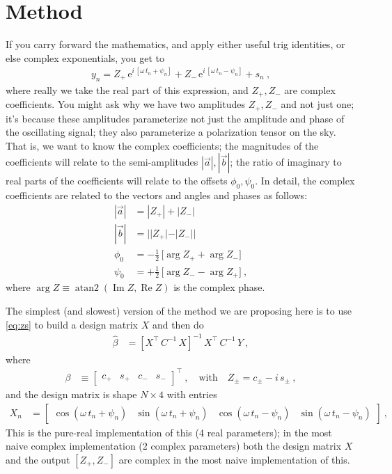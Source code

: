 \documentclass{article}
\newcommand{\e}{\mathrm{e}}
\begin{document}
\section{Method}\label{sec:method}
If you carry forward the mathematics, and apply either useful trig identities, or else complex exponentials, you get to
\begin{align}
    y_n = Z_+\,\e^{i\,[\omega\,t_n + \psi_n]} + Z_-\,\e^{i\,[\omega\,t_n - \psi_n]} + s_n ~, \label{eq:zs}
\end{align}
where really we take the real part of this expression,
and $Z_+, Z_-$ are complex coefficients.
You might ask why we have two amplitudes $Z_+, Z_-$ and not just one; it's because these amplitudes parameterize not just the amplitude and phase of the oscillating signal; they also parameterize a polarization tensor on the sky.
That is, we want to know the complex coefficients; the magnitudes of the coefficients will relate to the semi-amplitudes $|\vec{a}|,|\vec{b}|$; the ratio of imaginary to real parts of the coefficients will relate
to the offsets $\phi_0,\psi_0$.
In detail, the complex coefficients are related to the vectors and angles and phases as follows:
\begin{align}
    |\vec{a}| &= |Z_+|+|Z_-| \\
    |\vec{b}| &= ||Z_+|-|Z_-|| \\
    \phi_0 &= -\tfrac{1}{2}\,\bigl[\arg Z_+ + \arg Z_-\bigr] \\
    \psi_0 &= +\tfrac{1}{2}\,\bigl[\arg Z_- - \arg Z_+\bigr] ~,
\end{align}
where $\arg Z \equiv \operatorname{atan2}(\operatorname{Im} Z, \operatorname{Re} Z)$ is the complex phase.

The simplest (and slowest) version of the method we are proposing here is to use \eqref{eq:zs} to build a design matrix $X$ and then do
\begin{align}
    \hat{\beta} &= [X^\top\,C^{-1}\,X]^{-1}\,X^\top\,C^{-1}\,Y ~,
\end{align}
where
\begin{align}
    \beta &\equiv \begin{bmatrix} c_+ & s_+ & c_- & s_- \end{bmatrix}^\top ~,
    \quad\mbox{with}\quad Z_\pm = c_\pm - i\,s_\pm ~,
\end{align}
and the design matrix is shape $N \times 4$ with entries
\begin{align}
    X_n &= \begin{bmatrix}
        \cos(\omega\,t_n + \psi_n) &
        \sin(\omega\,t_n + \psi_n) &
        \cos(\omega\,t_n - \psi_n) &
        \sin(\omega\,t_n - \psi_n)
    \end{bmatrix} ~,
\end{align}
This is the pure-real implementation of this (4 real parameters);
in the most naive complex implementation (2 complex parameters)
both the design matrix $X$ and the output $[Z_+,Z_-]$ are complex in the most naive implementation of this.
\end{document}
